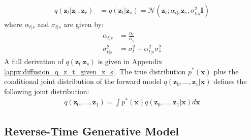 \documentclass[ oneside,%
                    author={George Herbert},
                    degree={MSci},
                     title={Video Diffusion Models for Climate Simulations},
                  subtitle={}]{dissertation}
\begin{document}
\begin{align}
      q(\mathbf{z}_t|\mathbf{z}_s,\mathbf{z}_r)&=q(\mathbf{z}_t|\mathbf{z}_s)=\mathcal{N}\left(\mathbf{z}_t; \alpha_{t|s}\mathbf{z}_s, \sigma_{t|s}^2\mathbf{I}\right)
\end{align}
where $\alpha_{t|s}$ and $\sigma_{t|s}$ are given by:
\begin{align}
      \alpha_{t|s} &= \frac{\alpha_t}{\alpha_s}\\
      \sigma_{t|s}^2 &= \sigma_t^2-\alpha_{t|s}^2\sigma_s^2
\end{align}
A full derivation of $q(\mathbf{z}_t|\mathbf{z}_s)$ is given in Appendix \ref{appx:diffusion_q_z_t_given_z_s}. The true distribution $p^*(\mathbf{x})$ plus the conditional joint distribution of the forward model $q(\mathbf{z}_0,\ldots,\mathbf{z}_1|\mathbf{x})$ defines the following joint distribution:
\begin{align}
      q(\mathbf{z}_0,\ldots,\mathbf{z}_1)=\int p^*(\mathbf{x}) q(\mathbf{z}_0,\ldots,\mathbf{z}_1|\mathbf{x}) d\mathbf{x}
\end{align}

\subsection{Reverse-Time Generative Model}
\label{sec:background_diffusion_reverse}
\end{document}
